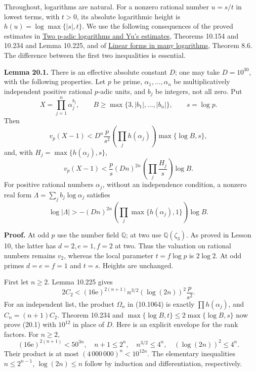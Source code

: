 \documentclass[
  11pt,
  a4paper,
]{article}
\begin{document}
Throughout, logarithms are natural. For a nonzero rational number
\(u=s/t\) in lowest terms, with \(t>0\), its absolute logarithmic height
is \(h(u)=\log\max\{|s|,t\}\). We use the following consequences of the
proved estimates in \href{https://kokunoyumeto.github.io/open-math-courses-public/courses/TR-BAKER/TR-BAKER-10.html}{Two p-adic logarithms and
Yu's estimates}, Theorems 10.154 and 10.234 and Lemma 10.225, and of
\href{https://kokunoyumeto.github.io/open-math-courses-public/courses/TR-BAKER/TR-BAKER-08.html}{Linear forms in many logarithms}, Theorem
8.6. The difference between the first two inequalities is essential.

\textbf{Lemma 20.1.} There is an effective absolute constant \(D\); one
may take \(D=10^{30}\), with the following properties. Let \(p\) be
prime, \(\alpha_1,\ldots,\alpha_n\) be multiplicatively independent
positive rational \(p\)-adic units, and \(b_j\) be integers, not all
zero. Put \[
 X=\prod_{j=1}^n\alpha_j^{b_j},\qquad
 B\ge\max\{3,|b_1|,\ldots,|b_n|\},\qquad s=\log p .
\] Then \[
 v_p(X-1)<
 D^n\frac{p}{s^2}\left(\prod_jh(\alpha_j)\right)
             \max\{\log B,s\},
 \tag{20.1}
\] and, with \(H_j=\max\{h(\alpha_j),s\}\), \[
 v_p(X-1)<
 \frac p s(Dn)^{2n}
       \left(\prod_j\frac{H_j}{s}\right)\log B .
 \tag{20.2}
\] For positive rational numbers \(\alpha_j\), without an independence
condition, a nonzero real form \(\Lambda=\sum_jb_j\log\alpha_j\)
satisfies \[
 \log|\Lambda|>
 -(Dn)^{2n}\left(\prod_j\max\{h(\alpha_j),1\}\right)\log B .
 \tag{20.3}
\]

\textbf{Proof.} At odd \(p\) use the number field \(\mathbb Q\); at two
use \(\mathbb Q(\zeta_3)\). As proved in Lesson 10, the latter has
\(d=2,e=1,f=2\) at two. Thus the valuation on rational numbers remains
\(v_2\), whereas the local parameter \(t=f\log p\) is \(2\log2\). At odd
primes \(d=e=f=1\) and \(t=s\). Heights are unchanged.

First let \(n\ge2\). Lemma 10.225 gives \[
 2C_2<(16\mathrm e)^{2(n+1)}
             n^{3/2}(\log(2n))^2\frac p{s^2}.
 \tag{20.4}
\] For an independent list, the product \(\Omega_n\) in (10.1064) is
exactly \(\prod h(\alpha_j)\), and \(C_n=(n+1)C_2\). Theorem 10.234 and
\(\max\{\log B,t\}\le2\max\{\log B,s\}\) now prove (20.1) with
\(10^{12}\) in place of \(D\). Here is an explicit envelope for the rank
factors. For \(n\ge2\), \[
 (16\mathrm e)^{2(n+1)}<50^{3n},\quad
 n+1\le2^n,\quad n^{3/2}\le4^n,\quad
 (\log(2n))^2\le4^n .
\] Their product is at most \((4\,000\,000)^n<10^{12n}\). The elementary
inequalities \(n\le2^{n-1}\), \(\log(2n)\le n\) follow by induction and
differentiation, respectively.
\end{document}
